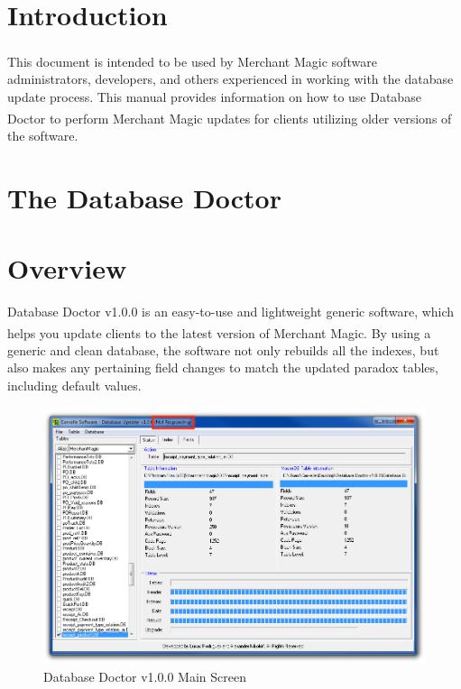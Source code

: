 \documentclass[a4paper, 11pt]{article}
\begin{document}
\pagestyle{fancy}
\fancyhf{}


\section*{Introduction}
This document is intended to be used by Merchant Magic\textsuperscript{\textregistered} software administrators, developers, and others experienced in working with the database update process. This manual provides information on how to use Database Doctor to perform Merchant Magic\textsuperscript{\textregistered} updates for clients utilizing older versions of the software. 

\section*{The Database Doctor}

\section{Overview}
Database Doctor v1.0.0 is an easy-to-use and lightweight generic software, which helps you update clients to the latest version of Merchant Magic\textsuperscript{\textregistered}. By using a generic and clean database, the software not only rebuilds all the indexes, but also makes any pertaining field changes to match the updated paradox tables, including default values. 

\begin{figure}[h]
    \centering
    \includegraphics[width=\textwidth]{capture 27}
    \caption{Database Doctor v1.0.0 Main Screen}
\end{figure}
\end{document}
